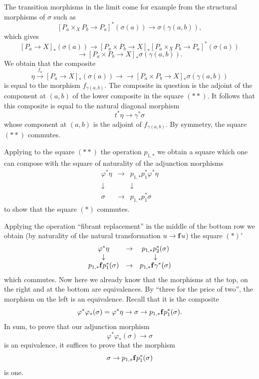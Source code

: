 The transition morphisms in the limit come for example
from the structural morphisms of $\sigma$ such as
$$
[P_a\times _XP_b\rightarrow P_a]^{\ast} (\sigma (a)) \rightarrow
\sigma (\gamma (a,b)),
$$
which gives
$$
[P_a\rightarrow X]_{\ast} (\sigma (a))\rightarrow
[P_a\times P_b\rightarrow X]_{\ast}
[P_a\times _XP_b\rightarrow P_a]^{\ast} (\sigma (a))
$$
$$
\rightarrow
[P_a\times P_b\rightarrow X]_{\ast}\sigma (\gamma (a,b)).
$$
We obtain that the composite
$$
\eta \stackrel{f_a}{\rightarrow}
[P_a\rightarrow X]_{\ast} (\sigma (a))\rightarrow
\rightarrow
[P_a\times P_b\rightarrow X]_{\ast}\sigma (\gamma (a,b))
$$
is equal to the morphism $f_{\gamma (a,b)}$.
The composite in question is the adjoint of
the component at $(a,b)$ of the lower composite in the square $(\ast \ast )$.
It follows that this composite
is equal to the natural diagonal morphism
$$
t^{\ast} \eta\rightarrow \gamma ^{\ast} \sigma
$$
whose component at $(a,b)$ is the adjoint of $f_{\gamma (a,b)}$.
By symmetry, the square $(\ast \ast )$ commutes.

Applying to the square $(\ast \ast )$ the operation
$p_{1,\ast }$ we obtain a square which one can compose with the square
of naturality of the adjunction morphisms
$$
\begin{array}{ccc}
\varphi ^{\ast} \eta & \rightarrow & p_{1,\ast } p_1^{\ast} \varphi ^{\ast}
\eta \\
\downarrow && \downarrow \\
\sigma &\rightarrow & p_{1,\ast } p_1^{\ast} \sigma
\end{array}
$$
to show that the square $(\ast )$ commutes.

Applying the operation ``fibrant replacement'' in the middle of the bottom
row we obtain (by naturality of the natural transformation $u\rightarrow
{\bf f}u$) the square $(\ast )'$
$$
\begin{array}{ccc}
\varphi ^{\ast} \eta &\rightarrow &
p _{1,\ast} p_2^{\ast} (\sigma )\\
\downarrow && \downarrow \\
p _{1,\ast} {\bf f} p_1^{\ast} (\sigma )&\rightarrow &
p _{1,\ast} {\bf f} \gamma ^{\ast}(\sigma )
\end{array}
$$
which commutes. Now here we already know that the morphisms at the top, on
the right
and at the bottom are equivalences. By ``three for the price of two'', the
morphism on the left is an equivalence. Recall that it is the
composite
$$
\varphi ^{\ast} \varphi _{\ast} (\sigma ) =\varphi ^{\ast} \eta
\rightarrow \sigma \rightarrow p _{1,\ast} {\bf f} p_1^{\ast} (\sigma ).
$$
In sum, to prove that our adjunction morphism
$$
\varphi ^{\ast} \varphi _{\ast} (\sigma ) \rightarrow \sigma
$$
is an equivalence, it suffices to
prove that the morphism
$$
\sigma \rightarrow p _{1,\ast} {\bf f} p_1^{\ast} (\sigma )
$$
is one.


